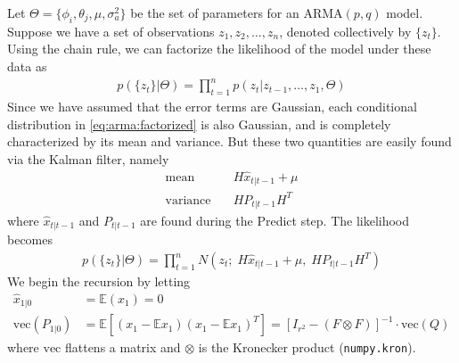 Let $\Theta = \{\phi_i, \theta_j, \mu, \sigma_a^2\}$ be the set of parameters
for an $\text{ARMA}(p,q)$ model. 
Suppose we have a set of observations $z_1,z_2,\ldots,z_n$, denoted
collectively by $\{z_t\}$.
Using the chain rule, we can factorize the
likelihood of the model under these data as
\begin{align}
    \label{eq:arma:factorized}
    p(\{z_t\} | \Theta) = \prod_{t=1}^{n} p(z_t | z_{t-1}, \ldots, z_{1},
    \Theta)
\end{align}
Since we have assumed that the error terms are Gaussian, each conditional
distribution in \ref{eq:arma:factorized} is also Gaussian, and is completely
characterized by its mean and variance. But these two quantities are easily
found via the Kalman filter, namely
\begin{align}
    \text{mean} & \quad H\hat{x}_{t|t-1} + \mu \\
    \text{variance} & \quad HP_{t|t-1}H^T
\end{align}
where $\hat{x}_{t|t-1}$ and $P_{t|t-1}$ are found during the Predict step. The
likelihood becomes
\begin{align}
    \label{eq:arma:likelihood}
    p(\{z_t\} | \Theta) = \prod_{t=1}^{n} N(z_t;\; H\hat{x}_{t|t-1} + \mu,\;
    HP_{t|t-1}H^T)
\end{align}
We begin the recursion by letting
\begin{align}
    \hat{x}_{1|0} &= \mathbb{E}(x_1) = 0 \\
    \text{vec}(P_{1|0}) &= \mathbb{E}\left[(x_1 - \mathbb{E}x_1)(x_1 -
    \mathbb{E}x_1)^T\right] = \left[I_{r^2} - (F \otimes F)\right]^{-1} \cdot
    \text{vec}(Q)
\end{align}
where $\text{vec}$ flattens a matrix and $\otimes$ is the Kronecker product
({\tt numpy.kron}).

